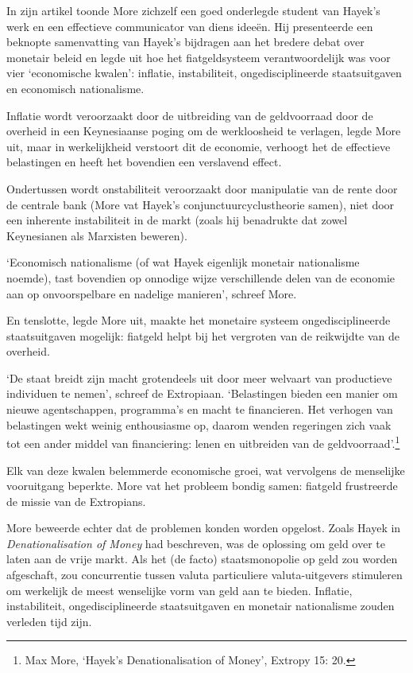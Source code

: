\documentclass[smalldemyvopaper,11pt,twoside,onecolumn,openright,extrafontsizes,hidelinks]{memoir}
\begin{document}
In zijn artikel toonde More zichzelf een goed onderlegde student van
Hayek's werk en een effectieve communicator van diens ideeën. Hij
presenteerde een beknopte samenvatting van Hayek's bijdragen aan het
bredere debat over monetair beleid en legde uit hoe het fiatgeldsysteem
verantwoordelijk was voor vier `economische kwalen': inflatie,
instabiliteit, ongedisciplineerde staatsuitgaven en economisch
nationalisme.

Inflatie wordt veroorzaakt door de uitbreiding van de geldvoorraad door
de overheid in een Keynesiaanse poging om de werkloosheid te verlagen,
legde More uit, maar in werkelijkheid verstoort dit de economie,
verhoogt het de effectieve belastingen en heeft het bovendien een
verslavend effect.

Ondertussen wordt onstabiliteit veroorzaakt door manipulatie van de
rente door de centrale bank (More vat Hayek's conjunctuurcyclustheorie
samen), niet door een inherente instabiliteit in de markt (zoals hij
benadrukte dat zowel Keynesianen als Marxisten beweren).

`Economisch nationalisme (of wat Hayek eigenlijk monetair nationalisme
noemde), tast bovendien op onnodige wijze verschillende delen van de
economie aan op onvoorspelbare en nadelige manieren', schreef More.

En tenslotte, legde More uit, maakte het monetaire systeem
ongedisciplineerde staatsuitgaven mogelijk: fiatgeld helpt bij het
vergroten van de reikwijdte van de overheid.

`De staat breidt zijn macht grotendeels uit door meer welvaart van
productieve individuen te nemen', schreef de Extropiaan. `Belastingen
bieden een manier om nieuwe agentschappen, programma's en macht te
financieren. Het verhogen van belastingen wekt weinig enthousiasme op,
daarom wenden regeringen zich vaak tot een ander middel van
financiering: lenen en uitbreiden van de geldvoorraad'.\footnote{Max
  More, `Hayek's Denationalisation of Money', Extropy 15: 20.}

Elk van deze kwalen belemmerde economische groei, wat vervolgens de
menselijke vooruitgang beperkte. More vat het probleem bondig samen:
fiatgeld frustreerde de missie van de Extropians.

More beweerde echter dat de problemen konden worden opgelost. Zoals
Hayek in \emph{Denationalisation of Money} had beschreven, was de
oplossing om geld over te laten aan de vrije markt. Als het (de facto)
staatsmonopolie op geld zou worden afgeschaft, zou concurrentie tussen
valuta particuliere valuta-uitgevers stimuleren om werkelijk de meest
wenselijke vorm van geld aan te bieden. Inflatie, instabiliteit,
ongedisciplineerde staatsuitgaven en monetair nationalisme zouden
verleden tijd zijn.
\end{document}
